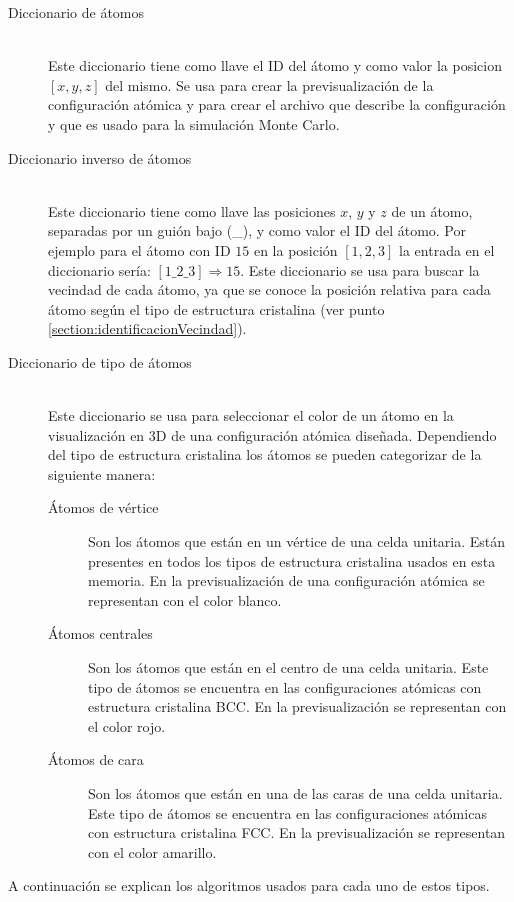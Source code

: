 \begin{description}
  \item [Diccionario de átomos] \hfill \\
  Este diccionario tiene como llave el ID del átomo y como valor la posicion $[x, y, z]$ del mismo. Se usa para crear la previsualización de la configuración atómica y para crear el archivo que describe la configuración y que es usado para la simulación Monte Carlo.
  \item [Diccionario inverso de átomos] \hfill \\
  Este diccionario tiene como llave las posiciones $x$, $y$ y $z$ de un átomo, separadas por un guión bajo (\_), y como valor el ID del átomo. Por ejemplo para el átomo con ID $15$ en la posición $[1, 2, 3]$ la entrada en el diccionario sería: $[1\_2\_3] \Rightarrow 15$. Este diccionario se usa para buscar la vecindad de cada átomo, ya que se conoce la posición relativa para cada átomo según el tipo de estructura cristalina (ver punto \ref{section:identificacionVecindad}).
  \item [Diccionario de tipo de átomos] \hfill \\
  Este diccionario se usa para seleccionar el color de un átomo en la visualización en 3D de una configuración atómica diseñada. Dependiendo del tipo de estructura cristalina los átomos se pueden categorizar de la siguiente manera:
    \begin{description}
      \item [Átomos de vértice] Son los átomos que están en un vértice de una celda unitaria. Están presentes en todos los tipos de estructura cristalina usados en esta memoria. En la previsualización de una configuración atómica se representan con el color blanco.
      \item [Átomos centrales] Son los átomos que están en el centro de una celda unitaria. Este tipo de átomos se encuentra en las configuraciones atómicas con estructura cristalina BCC. En la previsualización se representan con el color rojo.
      \item [Átomos de cara] Son los átomos que están en una de las caras de una celda unitaria. Este tipo de átomos se encuentra en las configuraciones atómicas con estructura cristalina FCC. En la previsualización se representan con el color amarillo.
    \end{description}
\end{description}

 A continuación se explican los algoritmos usados para cada uno de estos tipos.

